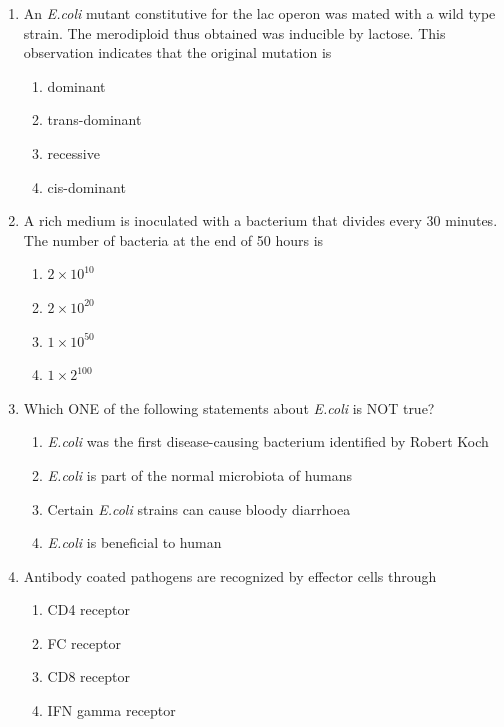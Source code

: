 \documentclass[journal,12pt,onecolumn]{IEEEtran}
\begin{document}
\begin{enumerate}[label=\arabic*.]
\item An \textit{E.coli} mutant constitutive for the lac operon was mated with a wild type strain. The merodiploid thus obtained was inducible by lactose. This observation indicates that the original mutation is
\begin{multicols}{2}
\begin{enumerate}[label=(\Alph*)]
\item dominant
\item trans-dominant
\item recessive
\item cis-dominant
\end{enumerate}
\end{multicols}

\item A rich medium is inoculated with a bacterium that divides every 30 minutes. The number of bacteria at the end of 50 hours is
\begin{multicols}{4}
\begin{enumerate}[label=(\Alph*)]
\item $2 \times 10^{10}$
\item $2 \times 10^{20}$
\item $1 \times 10^{50}$
\item $1 \times 2^{100}$
\end{enumerate}
\end{multicols}

\item Which ONE of the following statements about \textit{E.coli} is NOT true?
\begin{enumerate}[label=(\Alph*)]
\item \textit{E.coli} was the first disease-causing bacterium identified by Robert Koch
\item \textit{E.coli} is part of the normal microbiota of humans
\item Certain \textit{E.coli} strains can cause bloody diarrhoea
\item \textit{E.coli} is beneficial to human
\end{enumerate}

\item Antibody coated pathogens are recognized by effector cells through
\begin{multicols}{4}
\begin{enumerate}[label=(\Alph*)]
\item CD4 receptor
\item FC receptor
\item CD8 receptor
\item IFN gamma receptor
\end{enumerate}
\end{multicols}


\end{enumerate}
\end{document}
